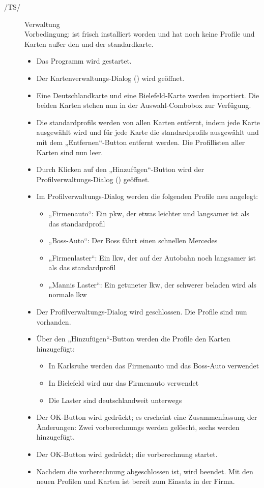 \documentclass[a4paper, 11pt]{article}
\makeatletter
\def\namedlabel#1#2{\begingroup
    #2%
    \def\@currentlabel{#2}%
    \phantomsection\label{#1}\endgroup
}
\newcommand{\oitem}[2]{
  \@ifundefined{c@oitem#1}{\newcounter{oitem#1}}{} %
  \addtocounter{oitem#1}{10}
  \item[\namedlabel{#1:#2}{/#1\arabic{oitem#1}/}]
}
\makeatother
\begin{document}
\begin{description}
\oitem{TS}{verwaltung} Verwaltung\\
Vorbedingung: \routeKIT ist frisch installiert worden und hat noch keine Profile und Karten außer den  und der \gls{standardkarte}.
\begin{itemize}
\item Das Programm \routeKIT wird gestartet.
\item Der Kartenverwaltungs-Dialog () wird geöffnet.
\item Eine Deutschlandkarte und eine Bie\-le\-feld-Karte werden importiert. Die beiden Karten stehen nun in der Auswahl-Combobox zur Verfügung.
\item Die \glspl{standardprofil} werden von allen Karten entfernt, indem jede Karte ausgewählt wird und für jede Karte die \glspl{standardprofil} ausgewählt und mit dem „Entfernen“-Button entfernt werden. Die Profillisten aller Karten sind nun leer.
\item Durch Klicken auf den „Hinzufügen“-Button wird der Profilverwaltungs-Dialog () geöffnet.
\item Im Profilverwaltungs-Dialog werden die folgenden Profile neu angelegt:
  \begin{itemize}
  \item „Firmenauto“: Ein \gls{pkw}, der etwas leichter und langsamer ist als das \gls{standardprofil}
  \item „Boss-Auto“: Der Boss fährt einen schnellen Mercedes
  \item „Firmenlaster“: Ein \gls{lkw}, der auf der Autobahn noch langsamer ist als das \gls{standardprofil}
  \item „Mannis Laster“: Ein getuneter \gls{lkw}, der schwerer beladen wird als normale \gls{lkw}
  \end{itemize}
\item Der Profilverwaltungs-Dialog wird geschlossen. Die Profile sind nun vorhanden.
\item Über den „Hinzufügen“-Button werden die Profile den Karten hinzugefügt:
  \begin{itemize}
  \item In Karlsruhe werden das Firmenauto und das Boss-Auto verwendet
  \item In Bielefeld wird nur das Firmenauto verwendet
  \item Die Laster sind deutschlandweit unterwegs
  \end{itemize}
\item Der OK-Button wird gedrückt; es erscheint eine Zusammenfassung der Änderungen: Zwei \glspl{vorberechnung} werden gelöscht, sechs werden hinzugefügt.
\item Der OK-Button wird gedrückt; die \gls{vorberechnung} startet.
\item Nachdem die \gls{vorberechnung} abgeschlossen ist, wird \routeKIT beendet. Mit den neuen Profilen und Karten ist \routeKIT bereit zum Einsatz in der Firma.
\end{itemize}
\end{description}
\end{document}

